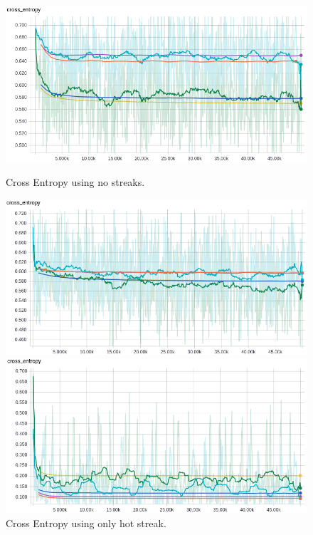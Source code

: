 \documentclass{article} %
\begin{document}
\begin{figure}[!htb]
  \includegraphics[width=\linewidth]{plots/model1/symmetrical/streak-/crossentropy.png}
  \caption{Cross Entropy using no streaks.}\label{fig:symmetrical--crossentropy}
\endminipage\hfill
{}
  \includegraphics[width=\linewidth]{plots/model1/symmetrical/streak-h/crossentropy.png}
  \caption{Cross Entropy using only hot streak.}\label{fig:symmetrical-h-crossentropy}
\endminipage\hfill
{}%
  \includegraphics[width=\linewidth]{plots/model1/symmetrical/streak-r/crossentropy.png}

\end{figure}
\end{document}
